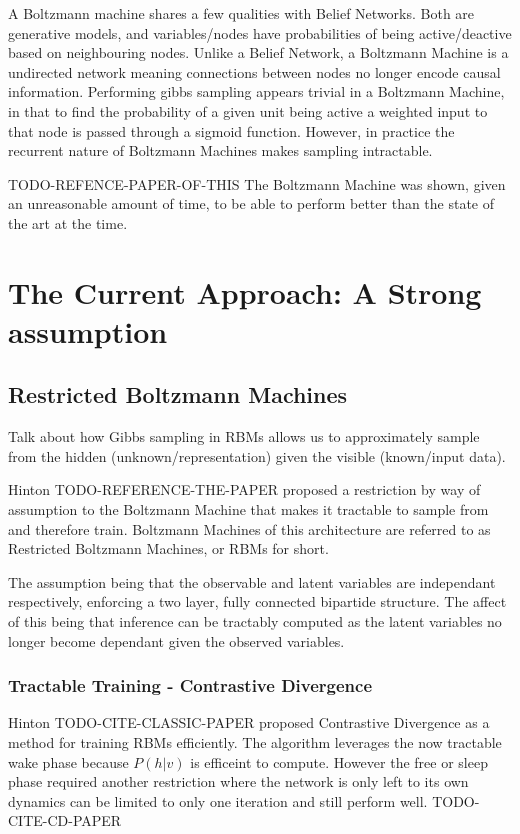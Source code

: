 A Boltzmann machine shares a few qualities with Belief Networks. Both are generative models, and variables/nodes have probabilities of being active/deactive based on neighbouring nodes. Unlike a Belief Network, a Boltzmann Machine is a undirected network meaning connections between nodes no longer encode causal information. Performing gibbs sampling appears trivial in a Boltzmann Machine, in that to find the probability of a given unit being active a weighted input to that node is passed through a sigmoid function. However, in practice the recurrent nature of Boltzmann Machines makes sampling intractable.

TODO-REFENCE-PAPER-OF-THIS The Boltzmann Machine was shown, given an unreasonable amount of time, to be able to perform better than the state of the art at the time.

\section{The Current Approach: A Strong assumption}

\subsection{Restricted Boltzmann Machines}

\todo%
Talk about how Gibbs sampling in RBMs allows us to approximately sample from the hidden (unknown/representation) given the visible (known/input data).
\todo%

Hinton TODO-REFERENCE-THE-PAPER proposed a restriction by way of assumption to the Boltzmann Machine that makes it tractable to sample from and therefore train. Boltzmann Machines of this architecture are referred to as Restricted Boltzmann Machines, or RBMs for short.

The assumption being that the observable and latent variables are independant respectively, enforcing a two layer, fully connected bipartide structure. The affect of this being that inference can be tractably computed as the latent variables no longer become dependant given the observed variables.

  \subsubsection{Tractable Training - Contrastive Divergence}
  Hinton TODO-CITE-CLASSIC-PAPER proposed Contrastive Divergence as a method for training RBMs efficiently. The algorithm leverages the now tractable wake phase because $P(h|v)$ is efficeint to compute. However the free or sleep phase required another restriction where the network is only left to its own dynamics can be limited to only one iteration and still perform well. TODO-CITE-CD-PAPER


